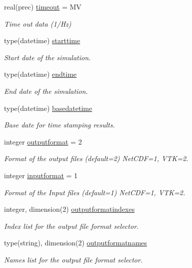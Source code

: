 \begin{DoxyCompactItemize}
real(prec) \mbox{\hyperlink{structsimulationglobals__mod_1_1parameters__t_a2be629afbb5291d0e8933c35dfb1f021}{timeout}} = MV
\begin{DoxyCompactList}\small\item\em Time out data (1/\+Hz) \end{DoxyCompactList}\item 
type(datetime) \mbox{\hyperlink{structsimulationglobals__mod_1_1parameters__t_a204cdccb6f9cd2fa137210a7f28f676d}{starttime}}
\begin{DoxyCompactList}\small\item\em Start date of the simulation. \end{DoxyCompactList}\item 
type(datetime) \mbox{\hyperlink{structsimulationglobals__mod_1_1parameters__t_a2fcf43eac4c8f57debf9f35d90a121f6}{endtime}}
\begin{DoxyCompactList}\small\item\em End date of the simulation. \end{DoxyCompactList}\item 
type(datetime) \mbox{\hyperlink{structsimulationglobals__mod_1_1parameters__t_a1bededd2546224cb5b4ebb290105a078}{basedatetime}}
\begin{DoxyCompactList}\small\item\em Base date for time stamping results. \end{DoxyCompactList}\item 
integer \mbox{\hyperlink{structsimulationglobals__mod_1_1parameters__t_a455601cb209772820789bdfd696628d2}{outputformat}} = 2
\begin{DoxyCompactList}\small\item\em Format of the output files (default=2) Net\+C\+DF=1, V\+TK=2. \end{DoxyCompactList}\item 
integer \mbox{\hyperlink{structsimulationglobals__mod_1_1parameters__t_af0d2d59bffc7e5b03b30c6a3ff038a83}{inputformat}} = 1
\begin{DoxyCompactList}\small\item\em Format of the Input files (default=1) Net\+C\+DF=1, V\+TK=2. \end{DoxyCompactList}\item 
integer, dimension(2) \mbox{\hyperlink{structsimulationglobals__mod_1_1parameters__t_ac4e90208e4fb5c5fc0a673b03fc908d7}{outputformatindexes}}
\begin{DoxyCompactList}\small\item\em Index list for the output file format selector. \end{DoxyCompactList}\item 
type(string), dimension(2) \mbox{\hyperlink{structsimulationglobals__mod_1_1parameters__t_a75f99aae482ed1092b84b5bbff494d99}{outputformatnames}}
\begin{DoxyCompactList}\small\item\em Names list for the output file format selector. \end{DoxyCompactList}\end{DoxyCompactItemize}



